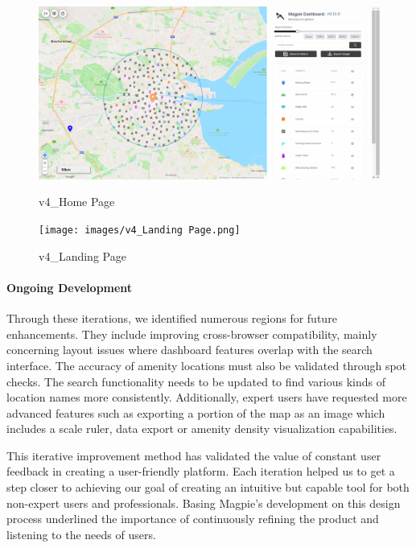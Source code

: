 \begin{figure}[htbp]
    \centering
    \begin{minipage}{0.48\textwidth}
        \centering
        \includegraphics[width=\textwidth]{images/v4_Home.png}
        \caption{v4\_Home Page}
        \label{fig:v4_Home Page}
    \end{minipage}
    \hfill
    \begin{minipage}{0.48\textwidth}
        \centering
        \texttt{[image: images/v4\_Landing Page.png]}
        \caption{v4\_Landing Page}
        \label{fig:v4_Landing Page}
    \end{minipage}
\end{figure}

\paragraph{Ongoing Development}

Through these iterations, we identified numerous regions for future enhancements.
They include improving cross-browser compatibility, mainly concerning layout
issues where dashboard features overlap with the search interface. 
The accuracy of amenity locations must also be validated through spot checks.
The search functionality needs to be updated to find various kinds of location 
names more consistently. Additionally, expert users have requested more advanced 
features such as exporting a portion of the map as an image which includes a scale 
ruler, data export or amenity density visualization capabilities.

This iterative improvement method has validated the value of constant user
feedback in creating a user-friendly platform. Each iteration helped us to
get a step closer to achieving our goal of creating an intuitive but capable
tool for both non-expert users and professionals. Basing Magpie's development on this 
design process underlined the importance of continuously refining the product and
listening to the needs of users.

